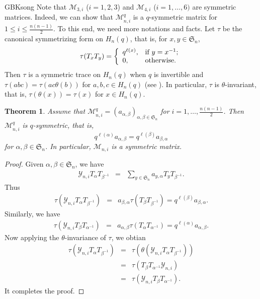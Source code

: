 \documentclass[13pt,a4paper, oneside]{amsart}       %
\numberwithin{equation}{section}
\newtheorem{theorem}[equation]{Theorem}
\theoremstyle{definition}
\theoremstyle{remark}
\begin{document}
\begin{CJK*}{GBK}{song}
Note that $\mathscr{M}_{3,i}$ ($i=1,2,3$) and $\mathscr{M}_{4,i}$ ($i=1,\ldots, 6)$ are symmetric matrices. Indeed, we can show that $\mathscr{M}^q_{n,i}$ is a $q$-symmetric matrix for $1\leq i\leq \frac{n(n-1)}{2}$. To this end, we need more notations and facts.
Let $\tau$ be the canonical symmetrizing form on $H_n(q)$, that is, for $x,y\in \mathfrak{S}_n$,
\begin{equation}\label{Equ:Canonical-symm-form}
  \tau(T_xT_{y})=\left\{\begin{array}{ll}
q^{\ell(x)}, & \hbox{if $y=x^{-1}$;}\\0,&\hbox{otherwise.}
 \end{array}\right.
 \end{equation}
Then $\tau$ is a symmetric trace on  $H_n(q)$ when $q$ is invertible and $\tau(abc)=\tau(ac\theta(b))$ for $a,b,c\in H_n(q)$ (see  \cite[Lemma~2.2]{Dipper-James}). In particular, $\tau$ is $\theta$-invariant, that is, $\tau(\theta(x))=\tau(x)$ for $x\in H_n(q)$.

\begin{theorem}\label{Them:Matrix-symm}Assume that $\mathscr{M}^q_{n,i}=(a_{\alpha,\beta})_{\alpha,\beta\in\mathfrak{S}_n}$ for $i=1, \ldots, \frac{n(n-1)}{2}$. Then $\mathscr{M}^q_{n,i}$ is $q$-symmetric, that is,
 \begin{equation*}
  q^{\ell(\alpha)}a_{\alpha,\beta}=q^{\ell(\beta)}a_{\beta,\alpha}
 \end{equation*}
for $\alpha,\beta\in\mathfrak{S}_n$.
In particular, $\mathscr{M}_{n,i}$ is a symmetric matrix.
\end{theorem}

\begin{proof} Given $\alpha,\beta\in \mathfrak{S}_n$, we have
\begin{eqnarray*}
\mathscr{Y}_{n,i}T_{\alpha}T_{\beta^{-1}}&=&
\sum_{y\in\mathfrak{S}_n}a_{y,\alpha}T_yT_{\beta^{-1}}.
\end{eqnarray*}
Thus
\begin{eqnarray*}
\tau(\mathscr{Y}_{n,i}T_{\alpha}T_{\beta^{-1}})&=&
a_{\beta,\alpha}\tau(T_{\beta}T_{\beta^{-1}})=q^{\ell(\beta)}a_{\beta,\alpha}.
\end{eqnarray*}
Similarly, we have
\begin{eqnarray*}
\tau(\mathscr{Y}_{n,i}T_{\beta}T_{\alpha^{-1}})&=&
a_{\alpha,\beta}\tau(T_{\alpha}T_{\alpha^{-1}})=
q^{\ell(\alpha)}a_{\alpha,\beta}.
\end{eqnarray*}
Now applying the $\theta$-invariance of $\tau$, we obtian
\begin{eqnarray*}
\tau(\mathscr{Y}_{n,i}T_{\alpha}T_{\beta^{-1}})&=&\tau(\theta(\mathscr{Y}_{n,i}T_{\alpha}T_{\beta^{-1}}))\\
&=&\tau(T_{\beta}T_{\alpha^{-1}}\mathscr{Y}_{n,i})\\
&=&\tau(\mathscr{Y}_{n,i}T_{\beta}T_{\alpha^{-1}}).
\end{eqnarray*}
It completes the proof.
\end{proof}


\end{CJK*}
\end{document}

